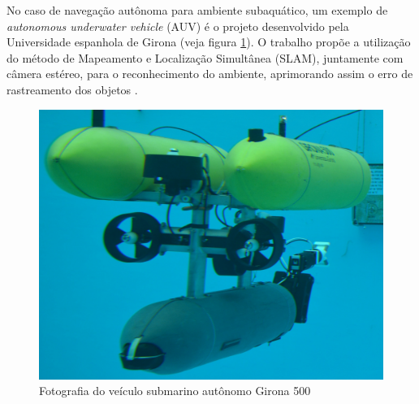 No caso de navegação autônoma para ambiente subaquático, um exemplo de \textit{autonomous underwater vehicle} (AUV) é o projeto desenvolvido pela Universidade espanhola de Girona (veja figura \ref{G500}). O trabalho propõe a utilização do método de Mapeamento e Localização Simultânea (SLAM), juntamente com câmera estéreo, para o reconhecimento do ambiente, aprimorando assim o erro de rastreamento dos objetos \cite{Nagappa2013}.


\begin{figure}[H]
 	\centering
 	\includegraphics[scale=0.09]{./Resources/G500.jpg}
 	\caption{Fotografia do veículo submarino autônomo Girona 500}
 	\label{G500}
\end{figure}


